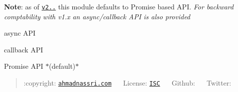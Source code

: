 {\bfseries Note}\+: as of \href{https://github.com/ahmadnassri/har-validator/releases/tag/v2.0.0}{\tt {\ttfamily v2..}} this module defaults to Promise based A\+PI. {\itshape For backward comptability with {\ttfamily v1.\+x} an async/callback A\+PI is also provided}


\begin{DoxyItemize}
\item async A\+PI
\item callback A\+PI
\item Promise A\+PI $\ast$(default)$\ast$ 

 \begin{quote}
\+:copyright\+: \href{https://www.ahmadnassri.com/}{\tt ahmadnassri.\+com} ~\textperiodcentered{}~ License\+: \href{http://choosealicense.com/licenses/isc/}{\tt I\+SC} ~\textperiodcentered{}~ Github\+: \href{https://github.com/ahmadnassri}{\tt } ~\textperiodcentered{}~ Twitter\+: \href{https://twitter.com/ahmadnassri}{\tt } \end{quote}

\end{DoxyItemize}